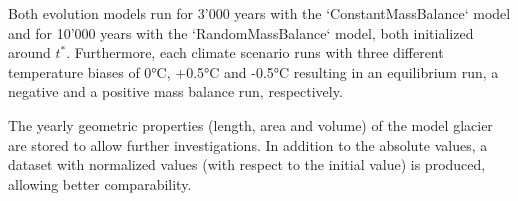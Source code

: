         Both evolution models run for 3'000 years with the `ConstantMassBalance` model and for 10'000 years with the `RandomMassBalance` model, both initialized around $t^*$. Furthermore, each climate scenario runs with three different temperature biases of 0°C, +0.5°C and -0.5°C resulting in an equilibrium run, a negative and a positive mass balance run, respectively.

        The yearly geometric properties (length, area and volume) of the model glacier are stored to allow further investigations. In addition to the absolute values, a dataset with normalized values (with respect to the initial value) is produced, allowing better comparability.

